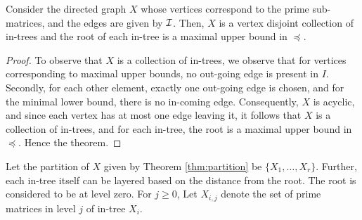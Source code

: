 \documentclass[MS]             %
              {iitmdiss_as}    %
\begin{document}
\begin{theorem} \label{thm:partition} Consider the directed graph $X$
  whose vertices correspond to the prime sub-matrices, and the edges
  are given by ${\cal I}$.  Then, $X$ is a vertex disjoint collection of
  in-trees and the root of each in-tree is a maximal upper bound in
  $\preccurlyeq$.
\end{theorem}
\begin{proof}
  To observe that $X$ is a collection of in-trees, we observe that for
  vertices corresponding to maximal upper bounds, no out-going edge is
  present in $I$.  Secondly, for each other element, exactly one
  out-going edge is chosen, and for the minimal lower bound, there is
  no in-coming edge.  Consequently, $X$ is acyclic, and since each
  vertex has at most one edge leaving it, it follows that $X$ is a
  collection of in-trees, and for each in-tree, the root is a maximal
  upper bound in $\preccurlyeq$.  Hence the theorem.
\end{proof}
Let the partition of $X$ given by Theorem \ref{thm:partition} be
$\{X_1,\ldots,X_r\}$.  Further, each in-tree itself can be layered
based on the distance from the root.  The root is considered to be at
level zero. For $j \geq 0$, Let $X_{i,j}$ denote the set of prime
matrices in level $j$ of in-tree $X_i$.
\end{document}
